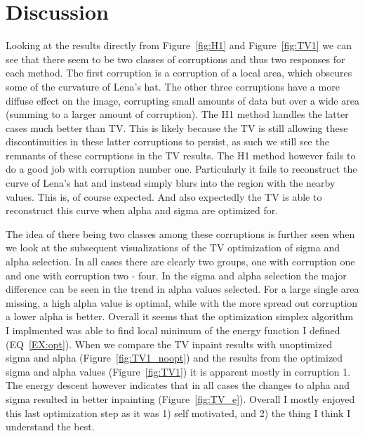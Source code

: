 \documentclass[12pt]{article}
\begin{document}
\section{Discussion}
\par{}
Looking at the results directly from Figure~\ref{fig:H1} and Figure~\ref{fig:TV1} we can see that there seem to be two classes of corruptions and thus two responses for each method. The first corruption is a corruption of a local area, which obscures some of the curvature of Lena's hat. The other three corruptions have a more diffuse effect on the image, corrupting small amounts of data but over a wide area (summing to a larger amount of corruption). The H1 method handles the latter cases much better than TV. This is likely because the TV is still allowing these discontinuities in these latter corruptions to persist, as such we still see the remnants of these corruptions in the TV results. The H1 method however fails to do a good job with corruption number one. Particularly it fails to reconstruct the curve of Lena's hat and instead simply blurs into the region with the nearby values. This is, of course expected. And also expectedly the TV is able to reconstruct this curve when alpha and sigma are optimized for.

\par{}
The idea of there being two classes among these corruptions is further seen when we look at the subsequent visualizations of the TV optimization of sigma and alpha selection. In all cases there are clearly two groups, one with corruption one and one with corruption two - four. In the sigma and alpha selection the major difference can be seen in the trend in alpha values selected. For a large single area missing, a high alpha value is optimal, while with the more spread out corruption a lower alpha is better. Overall it seems that the optimization simplex algorithm I implmented was able to find local minimum of the energy function I defined (EQ~\ref{EX:opt}). When we compare the TV inpaint results with unoptimized sigma and alpha (Figure~\ref{fig:TV1_noopt}) and the results from the optimized sigma and alpha values (Figure~\ref{fig:TV1}) it is apparent mostly in corruption 1. The energy descent however indicates that in all cases the changes to alpha and sigma resulted in better inpainting (Figure~\ref{fig:TV_e}). Overall I  mostly enjoyed this last optimization step as it was 1) self motivated, and 2) the thing I think I understand the best.
\end{document}
